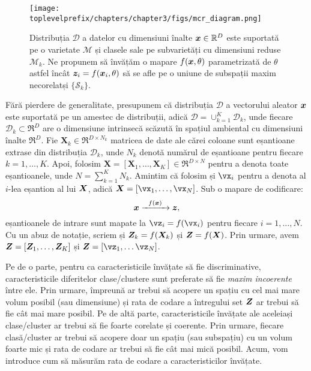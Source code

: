 \documentclass[../../book-main_ro.tex]{subfiles}
\begin{document}
\begin{figure}
	\centering
	\texttt{[image: \\toplevelprefix/chapters/chapter3/figs/mcr\_diagram.png]}
	\caption{Distribuția $\mathcal D$ a datelor cu dimensiuni înalte $\bm{x}\in \mathbb{R}^D$ este suportată pe o varietate $\mathcal{M}$ și clasele sale pe subvarietăți cu dimensiuni reduse $\mathcal{M}_k$. Ne propunem să învățăm o mapare $f(\bm{x}, \theta)$ parametrizată de $\theta$ astfel încât $\bm{z}_i = f(\bm{x}_i, \theta)$ să se afle pe o uniune de subspații maxim necorelatși $\{\mathcal{S}_k\}$.}
	\label{chap4-fig:mcr-diagram}
\end{figure}

Fără pierdere de generalitate, presupunem că distribuția $\mathcal D$ a vectorului aleator $\bm{x}$ este suportată pe un amestec de distribuții, adică $\mathcal D = \cup_{k=1}^K \mathcal{D}_k$, unde fiecare $\mathcal{D}_k \subset \Re^D$ are o dimensiune intrinsecă scăzută în spațiul ambiental cu dimensiuni înalte $\Re^D$. Fie $\bm X_k \in \Re^{D\times N_k}$ matricea de date ale cărei coloane sunt eșantioane extrase din distribuția $\mathcal{D}_k$, unde $N_k$ denotă numărul de eșantioane pentru fiecare $k=1,\dots,K$. Apoi, folosim $\bm X=[\bm X_1,\dots,\bm X_K] \in \Re^{D\times N}$ pentru a denota toate eșantioanele, unde $N=\sum_{k=1}^K N_k$.
Amintim că folosim și $\vx_i$ pentru a denota al $i$-lea eșantion al lui $\bm{X}$, adică $\X=[\vx_1,\dots,\vx_N]$. Sub o mapare de codificare:
\begin{equation}
	\bm{x}   \xrightarrow{\hspace{2mm} f(\bm{x})\hspace{2mm}} \bm{z},
\end{equation}
eșantioanele de intrare sunt mapate la $\vz_i = f(\vx_i)$ pentru fiecare $i=1,\dots,N$. Cu un abuz de notație, scriem și $\bm{Z}_k = f(\bm{X}_k)$ și $\bm{Z} = f(\bm{X})$. Prin urmare, avem $\bm{Z} = [\bm Z_1,\dots,\bm Z_K]$ și $\Z = [\vz_1,\dots\vz_N]$.

Pe de o parte, pentru ca caracteristicile învățate să fie discriminative, caracteristicile diferitelor clase/clustere sunt preferate să fie {\em maxim incoerente} între ele. Prin urmare, împreună ar trebui să acopere un spațiu cu cel mai mare volum posibil (sau dimensiune) și rata de codare a întregului set $\bm{Z}$ ar trebui să fie cât mai mare posibil. Pe de altă parte, caracteristicile învățate ale aceleiași clase/cluster ar trebui să fie foarte corelate și coerente. Prin urmare, fiecare clasă/cluster ar trebui să acopere doar un spațiu (sau subspațiu) cu un volum foarte mic și rata de codare ar trebui să fie cât mai mică posibil. Acum, vom introduce cum să măsurăm rata de codare a caracteristicilor învățate.
\end{document}
